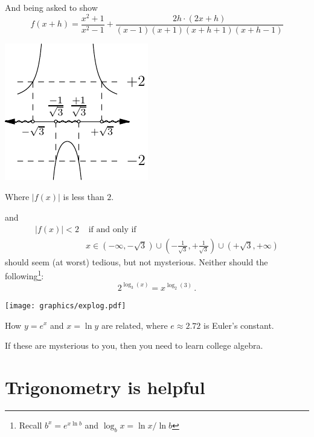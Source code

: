 And being asked to show
\begin{equation*}
    f(x+h)=\frac{x^2+1}{x^2-1}+ \frac{2h\cdot(2x+h)}{(x-1)(x+1)(x+h+1)(x+h-1)}
\end{equation*}
\begin{marginfigure}
\includegraphics[width=0.75\linewidth]{graphics/algebra2.pdf}
\caption{Where $|f(x)|$ is less than $2$.}
\label{fig:algebra2}
\end{marginfigure}
and
\begin{align*}
  |f(x)|<2 & \text{ if and only if } \\
           &  x \in (-\infty,-\sqrt{3})\cup(-\frac{1}{\sqrt{3}},+\frac{1}{\sqrt{3}})\cup(+\sqrt{3},+\infty)
\end{align*}
should seem (at worst) tedious, but not mysterious.  Neither should the following\footnote{Recall $b^x=e^{x \ln b}$ and $\log_b x=\ln x/\ln b$}:
\begin{equation*}
    2^{\log_3(x)}=x^{\log_2(3)} \,.
\end{equation*}
\begin{marginfigure}
\texttt{[image: graphics/explog.pdf]}
\caption{How $y=e^x$ and $x=\ln y$ are related, where $e \approx 2.72$ is Euler's constant.}
\label{fig:explog}
\end{marginfigure}

If these are mysterious to you, then you need to learn college algebra.
\section*{Trigonometry is helpful}

